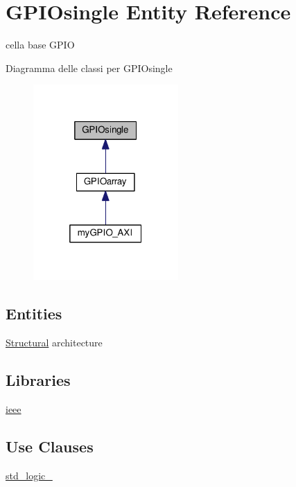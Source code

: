 \hypertarget{class_g_p_i_osingle}{\section{G\+P\+I\+Osingle Entity Reference}
\label{class_g_p_i_osingle}
}


cella base G\+P\+I\+O  




Diagramma delle classi per G\+P\+I\+Osingle\nopagebreak
\begin{figure}[H]
\begin{center}
\leavevmode
\includegraphics[width=157pt]{class_g_p_i_osingle__inherit__graph}
\end{center}
\end{figure}
\subsection*{Entities}
\begin{DoxyCompactItemize}
\item 
\hyperlink{class_g_p_i_osingle_1_1_structural}{Structural} architecture
\end{DoxyCompactItemize}
\subsection*{Libraries}
 \begin{DoxyCompactItemize}
\item 
\hypertarget{class_g_p_i_osingle_ga0a6af6eef40212dbaf130d57ce711256}{\hyperlink{group___g_p_i_o-single_ga0a6af6eef40212dbaf130d57ce711256}{ieee} }\label{class_g_p_i_osingle_ga0a6af6eef40212dbaf130d57ce711256}

\end{DoxyCompactItemize}
\subsection*{Use Clauses}
 \begin{DoxyCompactItemize}
\item 
\hypertarget{class_g_p_i_osingle_gacd03516902501cd1c7296a98e22c6fcb}{\hyperlink{group___g_p_i_o-single_gacd03516902501cd1c7296a98e22c6fcb}{std\+\_\+logic\+\_}   }\label{class_g_p_i_osingle_gacd03516902501cd1c7296a98e22c6fcb}

\end{DoxyCompactItemize}
